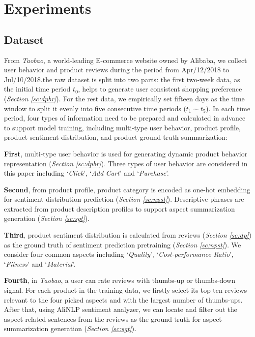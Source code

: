 \section{Experiments} \label{sc:exp} 
\subsection{Dataset}
From \textit{Taobao}, a world-leading E-commerce website owned by Alibaba, we collect user behavior and product reviews during the period from Apr/12/2018 to Jul/10/2018.the raw dataset is split into two parts: the first two-week data, as the initial time period $t_0$, helps to generate user consistent shopping preference (\textit{Section \ref{sc:dpbr}}). For the rest data, we empirically set fifteen days as the time window to split it evenly into five consecutive time periods ($t_{1} \sim t_{5}$). In each time period, four types of information need to be prepared and calculated in advance to support model training, including multi-type user behavior, product profile, product sentiment distribution, and product ground truth summarization: 

\textbf{First}, multi-type user behavior is used for generating dynamic product behavior representation (\textit{Section \ref{sc:dpbr}}). Three types of user behavior are considered in this paper including `\textit{Click}', `\textit{Add Cart}' and `\textit{Purchase}'.

\textbf{Second}, from product profile, product category is encoded as one-hot embedding for sentiment distribution prediction (\textit{Section \ref{sc:npst}}). Descriptive phrases are extracted from product description profiles to support aspect summarization generation (\textit{Section \ref{sc:sgt}}). 

\textbf{Third}, product sentiment distribution is calculated from reviews (\textit{Section \ref{sc:dp}}) as the ground truth of sentiment prediction pretraining (\textit{Section \ref{sc:npst}}). We consider four common aspects including `\textit{Quality}', `\textit{Cost-performance Ratio}', `\textit{Fitness}' and `\textit{Material}'.

\textbf{Fourth}, in \textit{Taobao}, a user can rate reviews with thumbs-up or thumbs-down signal. For each product in the training data, we firstly select its top ten reviews relevant to the four picked aspects and with the largest number of thumbs-ups. After that, using AliNLP sentiment analyzer, we can locate and filter out the aspect-related sentences from the reviews as the ground truth for aspect summarization generation (\textit{Section \ref{sc:sgt}}).  

